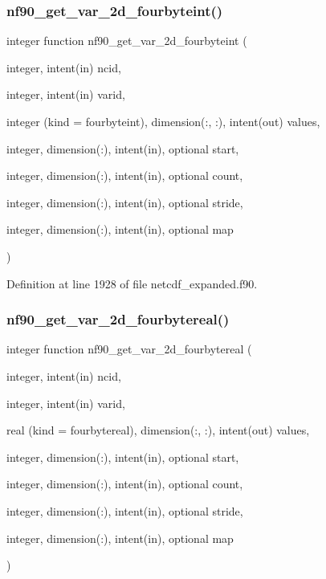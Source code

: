 \subsubsection{\texorpdfstring{nf90\+\_\+get\+\_\+var\+\_\+2d\+\_\+fourbyteint()}{nf90\_get\_var\_2d\_fourbyteint()}}
{\footnotesize\ttfamily integer function nf90\+\_\+get\+\_\+var\+\_\+2d\+\_\+fourbyteint (\begin{DoxyParamCaption}\item[{integer, intent(in)}]{ncid,  }\item[{integer, intent(in)}]{varid,  }\item[{integer (kind = fourbyteint), dimension(\+:, \+:), intent(out)}]{values,  }\item[{integer, dimension(\+:), intent(in), optional}]{start,  }\item[{integer, dimension(\+:), intent(in), optional}]{count,  }\item[{integer, dimension(\+:), intent(in), optional}]{stride,  }\item[{integer, dimension(\+:), intent(in), optional}]{map }\end{DoxyParamCaption})}



Definition at line 1928 of file netcdf\+\_\+expanded.\+f90.

\mbox{\label{netcdf__expanded_8f90_a198873518ae0f4c5b2c517eeed4408ed}} 
\subsubsection{\texorpdfstring{nf90\+\_\+get\+\_\+var\+\_\+2d\+\_\+fourbytereal()}{nf90\_get\_var\_2d\_fourbytereal()}}
{\footnotesize\ttfamily integer function nf90\+\_\+get\+\_\+var\+\_\+2d\+\_\+fourbytereal (\begin{DoxyParamCaption}\item[{integer, intent(in)}]{ncid,  }\item[{integer, intent(in)}]{varid,  }\item[{real (kind = fourbytereal), dimension(\+:, \+:), intent(out)}]{values,  }\item[{integer, dimension(\+:), intent(in), optional}]{start,  }\item[{integer, dimension(\+:), intent(in), optional}]{count,  }\item[{integer, dimension(\+:), intent(in), optional}]{stride,  }\item[{integer, dimension(\+:), intent(in), optional}]{map }\end{DoxyParamCaption})}



